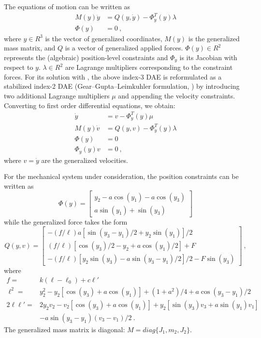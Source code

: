 The equations of motion can be written as
\begin{equation*}
  \begin{split}
    M(y) \ddot y &= Q(y,\dot y) - \Phi_y^T(y) \lambda \\
    \Phi(y)     &= 0 ~,
  \end{split}
\end{equation*}
where $y \in R^3$ is the vector of generalized coordinates, $M(y)$ is the generalized mass
matrix, and $Q$ is a vector of generalized applied forces. $\Phi(y) \in R^2$ represents the
(algebraic) position-level constraints and $\Phi_y$ is its Jacobian with respect to $y$.
$\lambda \in R^2$ are Lagrange multipliers corresponding to the constraint forces.
For its solution with {\idas}, the above index-3 DAE is reformulated as a stabilized 
index-2 DAE (Gear--Gupta--Leimkuhler formulation, \cite{GGL:85}) by introducing two
additional Lagrange multipliers $\mu$ and appending the velocity constraints.
Converting to first order differential equations, we obtain:
\begin{equation}\label{e:GGLform}
\begin{split}
  \dot y &= v - \Phi_y^T(y) \mu  \\
  M(y) \dot v &= Q(y,v) - \Phi_y^T(y) \lambda \\
  \Phi(y)     &= 0 \\
  \Phi_y(y) v &= 0 ~,
\end{split}
\end{equation}
where $v = \dot y$ are the generalized velocities.

For the mechanical system under consideration, the position constraints can be written as
\begin{equation*}
  \Phi(y) = \begin{bmatrix}
    y_2 - a \cos(y_1) - a \cos(y_3) \\
    a \sin(y_1) + \sin(y_3)
  \end{bmatrix}
\end{equation*}
while the generalized force takes the form
\begin{equation*}
  Q(y, v) = \begin{bmatrix}
    - (f/\ell) a [\sin(y_3-y_1)/2 + y_2 \sin(y_1)]/2 \\
    (f/\ell) [\cos(y_3)/2 - y_2 + a \cos(y_1)/2 ] + F \\
    - (f/\ell) [ y_2 \sin(y_3) - a \sin(y_3-y_1)/2]/2 - F \sin(y_3)
  \end{bmatrix} ~,
\end{equation*}
where
\begin{equation*}
  \begin{split}
    f = & k (\ell - \ell_0) + c {\ell}' \\
    \ell^2 = & y_2^2 - y_2 [\cos(y_3) + a \cos(y_1)] + (1 + a^2)/4 + a \cos(y_3-y_1)/2 \\
    2 \ell {\ell}' = & 2 y_2 v_2 - v_2 [\cos(y_3) + a \cos(y_1)] + y_2 [\sin(y_3)v_3 + a\sin(y_1)v_1] \\
    & - a \sin(y_3-y_1) (v_3-v_1)/2 ~.
  \end{split}
\end{equation*}
The generalized mass matrix is diagonal: $M = diag \{J_1, m_2, J_2\}$.

